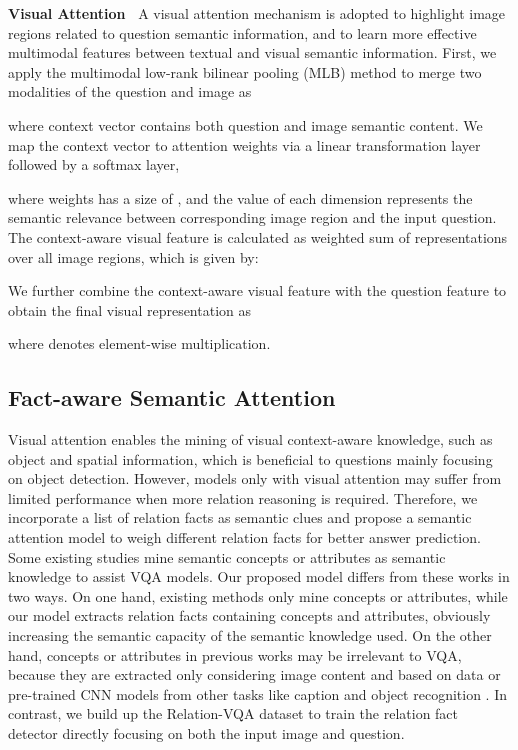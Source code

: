 \documentclass[sigconf]{acmart}
\begin{document}
\textbf{Visual Attention~} A visual attention mechanism is adopted to highlight image regions related to question semantic information, and to learn more effective multimodal features between textual and visual semantic information. First, we apply the multimodal low-rank bilinear pooling (MLB) method \cite{kim2016hadamard} to merge two modalities of the question and image as

where context vector  contains both question and image semantic content.
We map the  context vector to attention weights via a linear transformation layer followed by a softmax layer, 

where weights  has a size of , and the value of each dimension represents the semantic relevance between corresponding image region and the input question. The context-aware visual feature is calculated as weighted sum of representations over all image regions, which is given by:

We further combine the context-aware visual feature with the question feature to obtain the final visual representation as

where  denotes element-wise multiplication.


\subsection{Fact-aware Semantic Attention}\label{subsection:52}


Visual attention enables the mining of visual context-aware knowledge, such as object and spatial information, which is beneficial to questions mainly focusing on object detection. However, models only with visual attention may suffer from limited performance when more relation reasoning is required.
Therefore, we incorporate a list of relation facts as semantic clues and 
propose a semantic attention model to weigh different relation facts for better answer prediction. 
Some existing studies mine semantic concepts or attributes as semantic knowledge to assist VQA models. Our proposed model differs from these works in two ways. On one hand, existing methods only mine concepts or attributes, while our model extracts relation facts containing concepts and attributes, obviously increasing the semantic capacity of the semantic knowledge used. On the other hand, concepts or attributes in previous works may be irrelevant to VQA, because they are extracted only considering image content and based on data or pre-trained CNN models from other tasks like caption and object recognition \cite{yu2017multi}. 
In contrast, we build up the Relation-VQA dataset to train the relation fact detector directly focusing on both the input image and question.
\end{document}
